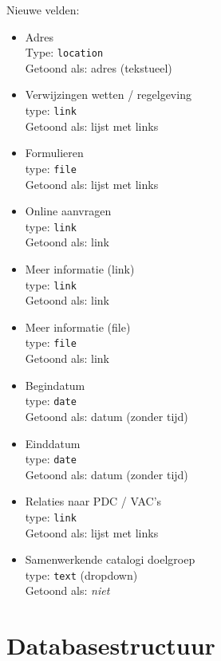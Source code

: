 \documentclass[12pt]{article}
\begin{document}
Nieuwe velden:
\begin{itemize}
\item Adres \\
Type: \texttt{location} \\
Getoond als: adres (tekstueel)
\item Verwijzingen wetten / regelgeving \\
type: \texttt{link} \\
Getoond als: lijst met links
\item Formulieren \\
type: \texttt{file} \\
Getoond als: lijst met links
\item Online aanvragen \\
type: \texttt{link} \\
Getoond als: link
\item Meer informatie (link) \\
type: \texttt{link} \\
Getoond als: link
\item Meer informatie (file) \\
type: \texttt{file} \\
Getoond als: link
\item Begindatum \\
type: \texttt{date} \\
Getoond als: datum (zonder tijd)
\item Einddatum\\
type: \texttt{date} \\
Getoond als: datum (zonder tijd)
\item Relaties naar PDC / VAC's \\
type: \texttt{link} \\
Getoond als: lijst met links
\item Samenwerkende catalogi doelgroep \\
type: \texttt{text} (dropdown) \\
Getoond als: \emph{niet}
\end{itemize}

\clearpage
\section{Databasestructuur}
\end{document}
